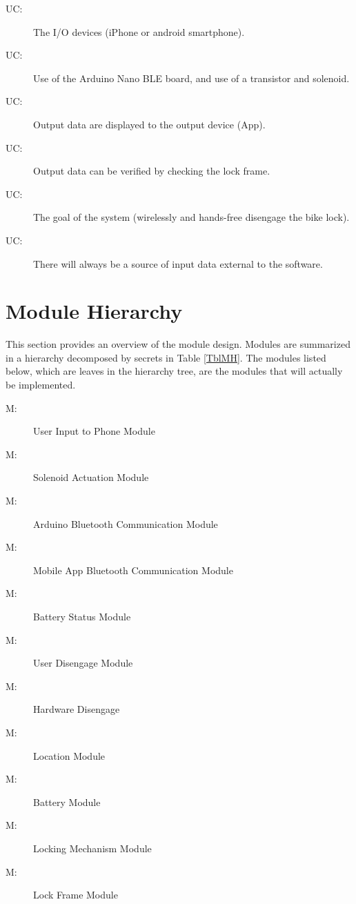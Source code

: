 \documentclass[12pt, titlepage]{article}
\newcounter{ucnum}
\newcommand{\uctheucnum}{UC\theucnum}
\newcounter{mnum}
\newcommand{\mthemnum}{M\themnum}
\begin{document}
\begin{description}

\item[\uctheucnum\label{ucIO}:] The I/O devices (iPhone or android smartphone). 
\item[\uctheucnum\label{ucCircuit}:] Use of the Arduino Nano BLE board, and use of a transistor and solenoid.
\item[\uctheucnum\label{ucOutput}:] Output data are displayed to the output device (App). 
\item[\uctheucnum\label{ucVerify}:] Output data can be verified by checking the lock frame. 
\item[\uctheucnum\label{ucGoal}:] The goal of the system (wirelessly and hands-free disengage the bike lock). 
\item[\uctheucnum\label{ucInput}:] There will always be a source of input data external to the software.

\end{description}

\section{Module Hierarchy} \label{SecMH}

This section provides an overview of the module design. Modules are summarized
in a hierarchy decomposed by secrets in Table \ref{TblMH}. The modules listed
below, which are leaves in the hierarchy tree, are the modules that will
actually be implemented.

\begin{description}
\item [ \mthemnum \label{mUIP}:] User Input to Phone Module
\item [ \mthemnum \label{mSA}:] Solenoid Actuation Module
\item [ \mthemnum \label{mABC}:] Arduino Bluetooth Communication Module
\item [ \mthemnum \label{mMABC}:] Mobile App Bluetooth Communication Module
\item [ \mthemnum \label{mBS}:] Battery Status Module 
\item [ \mthemnum \label{mUD}:] User Disengage Module
\item [ \mthemnum \label{mHD}:] Hardware Disengage
\item [ \mthemnum \label{mL}:] Location Module 
\item [ \mthemnum \label{mB}:] Battery Module 
\item [ \mthemnum \label{mLM}:] Locking Mechanism Module 
\item [ \mthemnum \label{mLF}:] Lock Frame Module 

\end{description}
\end{document}
